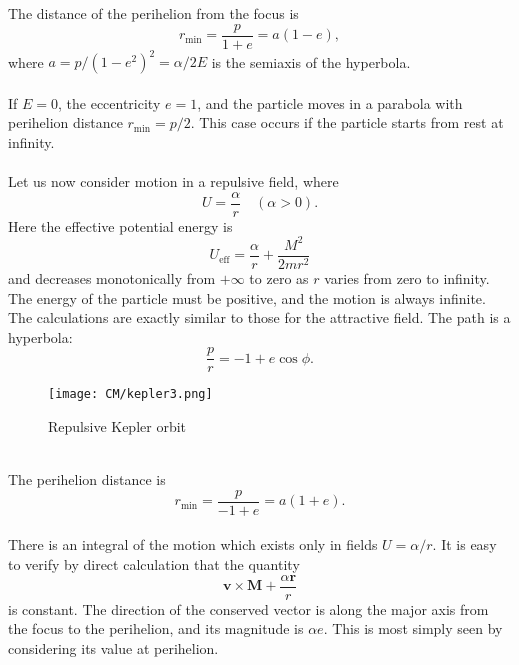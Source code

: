 The distance of the perihelion from the focus is
\[r_{\mathrm{min}} = \frac{p}{1+e} = a(1-e),\]
where $a = {p}/{(1-e^2)^2} = {\alpha}/{2E}$ is the semiaxis of the hyperbola.
\\ \\
If $E = 0$, the eccentricity $e = 1$, and the particle moves in a parabola with perihelion distance $r_{\mathrm{min}} = {p}/{2}$. This case occurs if the particle starts from rest at infinity.
\\ \\
Let us now consider motion in a repulsive field, where
\[U= \frac{\alpha}{r} \quad (\alpha > 0).\]
Here the effective potential energy is
\[U_{\mathrm{eff}} = \frac{\alpha}{r} + \frac{M^2}{2mr^2} \]
and decreases monotonically from $+\infty$ to zero as $r$ varies from zero to infinity.
The energy of the particle must be positive, and the motion is always infinite. The calculations are exactly similar to those for the attractive field.
The path is a hyperbola:
\[\frac{p}{r} = -1 + e\cos\phi.\]
\begin{figure}[!h]
	\centering
	\texttt{[image: CM/kepler3.png]}
	\caption{Repulsive Kepler orbit}
\end{figure}
\\
The perihelion distance is
\[r_{\mathrm{min}} = \frac{p}{-1+e} = a(1+e).\]
\\
There is an integral of the motion which exists only in fields $U = {\alpha}/{r}$. 
It is easy to verify by direct calculation that the quantity
\[\bm{v}\times\bm{M} + \frac{\alpha \bm{r}}{r} \]
is constant. The direction of the conserved vector is along the major axis from the focus to the perihelion, and its magnitude is $\alpha e$. This is most simply seen by considering its value at perihelion.

